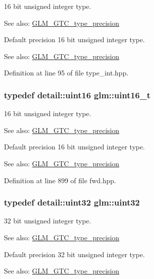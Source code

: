 16 bit unsigned integer type. \begin{Desc}
\item[See also:]\hyperlink{group__gtc__type__precision}{GLM\_\-GTC\_\-type\_\-precision}\end{Desc}
Default precision 16 bit unsigned integer type. \begin{Desc}
\item[See also:]\hyperlink{group__gtc__type__precision}{GLM\_\-GTC\_\-type\_\-precision} \end{Desc}


Definition at line 95 of file type\_\-int.hpp.\hypertarget{group__gtc__type__precision_gc4eb4f43cae8129b00086dc234d3b8fc}{
\subsubsection[uint16\_\-t]{\setlength{\rightskip}{0pt plus 5cm}typedef detail::uint16 {\bf glm::uint16\_\-t}}}
\label{group__gtc__type__precision_gc4eb4f43cae8129b00086dc234d3b8fc}


16 bit unsigned integer type. \begin{Desc}
\item[See also:]\hyperlink{group__gtc__type__precision}{GLM\_\-GTC\_\-type\_\-precision}\end{Desc}
Default precision 16 bit unsigned integer type. \begin{Desc}
\item[See also:]\hyperlink{group__gtc__type__precision}{GLM\_\-GTC\_\-type\_\-precision} \end{Desc}


Definition at line 899 of file fwd.hpp.\hypertarget{group__gtc__type__precision_g202b6a53c105fcb7e531f9b443518451}{
\subsubsection[uint32]{\setlength{\rightskip}{0pt plus 5cm}typedef detail::uint32 {\bf glm::uint32}}}
\label{group__gtc__type__precision_g202b6a53c105fcb7e531f9b443518451}


32 bit unsigned integer type. \begin{Desc}
\item[See also:]\hyperlink{group__gtc__type__precision}{GLM\_\-GTC\_\-type\_\-precision}\end{Desc}
Default precision 32 bit unsigned integer type. \begin{Desc}
\item[See also:]\hyperlink{group__gtc__type__precision}{GLM\_\-GTC\_\-type\_\-precision} \end{Desc}


